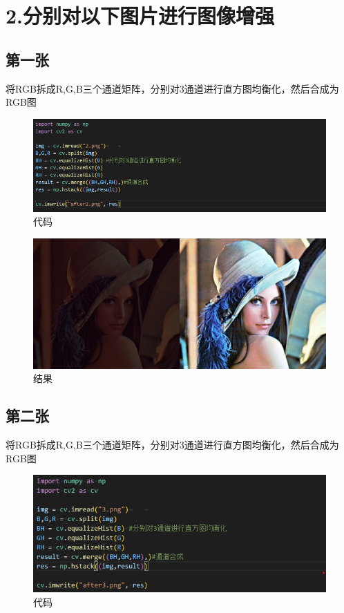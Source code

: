 \documentclass[fontset=windows]{article}
\begin{document}
    \section{2.分别对以下图片进行图像增强}

        \subsection{第一张}

            将RGB拆成R,G,B三个通道矩阵，分别对3通道进行直方图均衡化，然后合成为RGB图

            \begin{figure}[H]
                \centering
                \includegraphics[scale=0.6]{code2.png}
                \caption{代码}
            \end{figure}

            \begin{figure}[H]
                \centering
                \includegraphics[scale=0.35]{after2.png}
                \caption{结果}
            \end{figure}

        \subsection{第二张}

            将RGB拆成R,G,B三个通道矩阵，分别对3通道进行直方图均衡化，然后合成为RGB图

            \begin{figure}[H]
                \centering
                \includegraphics[scale=0.6]{code3.png}
                \caption{代码}
            \end{figure}
\end{document}
